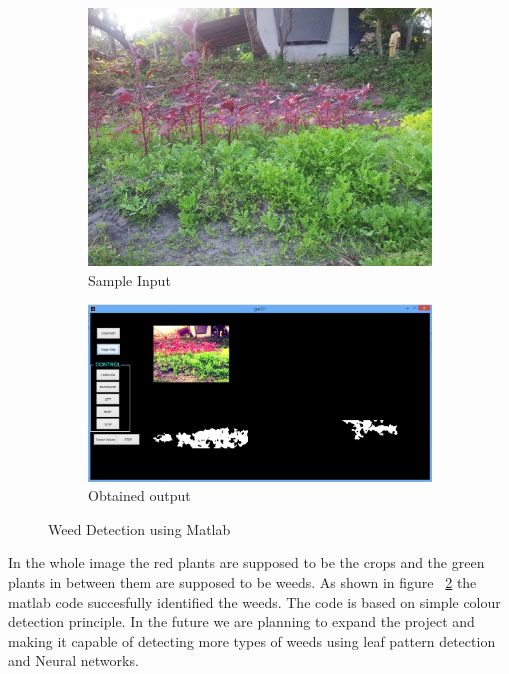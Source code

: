 \documentclass{report}
\begin{document}
\begin{figure}[h!]
\centering

\begin{subfigure}{0.5\textwidth}
	\includegraphics[width=\textwidth]{image.jpg}
	\caption{Sample Input}
	\label{fig39a}
\end{subfigure}
\begin{subfigure}{0.5\textwidth}
	\includegraphics[width=\textwidth]{imagedata}
	\caption{Obtained output}
	\label{fig39b}
\end{subfigure}
\caption{Weed Detection using Matlab}
\label{fig39}
\end{figure}
\FloatBarrier
In the whole image the red plants are supposed to be the crops and the green plants in between them are supposed to be weeds.
As shown in figure ~\ref{fig39b} the matlab code succesfully identified the weeds.
The code is based on simple colour detection principle. In the future we are planning to expand the project and making it capable of detecting more types of weeds using leaf pattern detection and Neural networks.\\
\end{document}
